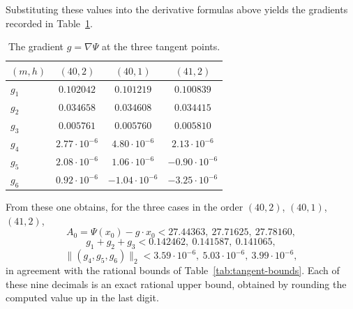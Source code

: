 \documentclass[11pt]{article}
\theoremstyle{definition}
\theoremstyle{remark}
\numberwithin{equation}{section}
\begin{document}
Substituting these values into the derivative formulas above yields the gradients
recorded in Table~\ref{tab:app-gradients}.
\begin{table}[ht]
\centering
\caption{The gradient $g=\nabla\Psi$ at the three tangent
points.}\label{tab:app-gradients}
\begin{tabular}{lccc}
\toprule
$(m,h)$ & $(40,2)$ & $(40,1)$ & $(41,2)$\\
\midrule
$g_1$ & $0.102042$ & $0.101219$ & $0.100839$\\
$g_2$ & $0.034658$ & $0.034608$ & $0.034415$\\
$g_3$ & $0.005761$ & $0.005760$ & $0.005810$\\
$g_4$ & $2.77\cdot10^{-6}$ & $4.80\cdot10^{-6}$ & $2.13\cdot10^{-6}$\\
$g_5$ & $2.08\cdot10^{-6}$ & $1.06\cdot10^{-6}$ & $-0.90\cdot10^{-6}$\\
$g_6$ & $0.92\cdot10^{-6}$ & $-1.04\cdot10^{-6}$ & $-3.25\cdot10^{-6}$\\
\bottomrule
\end{tabular}
\end{table}
From these one obtains, for the three cases in the order $(40,2)$, $(40,1)$,
$(41,2)$,
\[
  A_0=\Psi(x_0)-g\cdot x_0<27.44363,\ 27.71625,\ 27.78160,
\]
\[
  g_1+g_2+g_3<0.142462,\ 0.141587,\ 0.141065,
\]
\[
  \|(g_4,g_5,g_6)\|_2<3.59\cdot10^{-6},\ 5.03\cdot10^{-6},\ 3.99\cdot10^{-6},
\]
in agreement with the rational bounds of Table~\ref{tab:tangent-bounds}. Each of
these nine decimals is an exact rational upper bound, obtained by rounding the
computed value up in the last digit.
\end{document}
